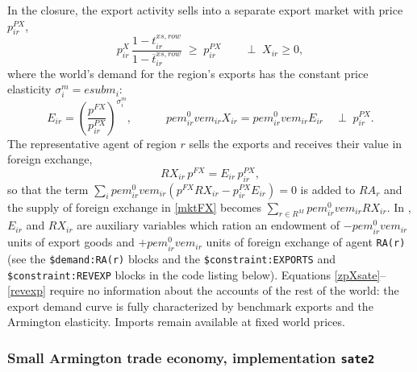 In the \SATE closure, the export activity sells into a separate export market with price $p^{PX}_{ir}$,
\begin{equation}\label{zpXsate}
p^X_{ir}\,\frac{1-t^{xs,row}_{ir}}{1-\overline{t}^{xs,row}_{ir}} \;\geq\; p^{PX}_{ir}
\qquad \perp \; X_{ir}\geq 0,
\end{equation}
where the world's demand for the region's exports has the constant price elasticity $\sigma^m_i=\textit{esubm}_i$:
\begin{equation}\label{exportdemand}
E_{ir} = \left(\frac{p^{FX}}{p^{PX}_{ir}}\right)^{\sigma^m_i},
\qquad\quad
\textit{pem}^0_{ir}\textit{vem}_{ir}X_{ir} = \textit{pem}^0_{ir}\textit{vem}_{ir}E_{ir}
\quad \perp\; p^{PX}_{ir}.
\end{equation}
The representative agent of region $r$ sells the exports and receives their value in foreign exchange,
\begin{equation}\label{revexp}
\textit{RX}_{ir}\,p^{FX} = E_{ir}\,p^{PX}_{ir},
\end{equation}
so that the term $\sum_i \textit{pem}^0_{ir}\textit{vem}_{ir}\left(p^{FX}\textit{RX}_{ir}-p^{PX}_{ir}E_{ir}\right)=0$ is added to $\textit{RA}_r$ and the supply of foreign exchange in \eqref{mktFX} becomes $\sum_{r\in R^M}\textit{pem}^0_{ir}\textit{vem}_{ir}\textit{RX}_{ir}$.
In \MPSGE, $E_{ir}$ and $\textit{RX}_{ir}$ are auxiliary variables which ration an endowment of $-\textit{pem}^0_{ir}\textit{vem}_{ir}$ units of export goods and $+\textit{pem}^0_{ir}\textit{vem}_{ir}$ units of foreign exchange of agent \texttt{RA(r)} (see the \texttt{\$demand:RA(r)} blocks and the \texttt{\$constraint:EXPORTS} and \texttt{\$constraint:REVEXP} blocks in the code listing below).
Equations \eqref{zpXsate}--\eqref{revexp} require no information about the accounts of the rest of the world: the export demand curve is fully characterized by benchmark exports and the Armington elasticity.
Imports remain available at fixed world prices.

\subsubsection{Small Armington trade economy, implementation \texttt{sate2}}

